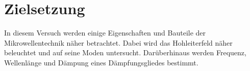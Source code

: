 \section{Zielsetzung}
\label{sec:Zielsetzung}

In diesem Versuch werden einige Eigenschaften und Bauteile der Mikrowellentechnik näher betrachtet. Dabei wird das Hohleiterfeld näher beleuchtet und auf seine Moden untersucht. Darüberhinaus werden Frequenz, Wellenlänge und Dämpung eines Dämpfungsgliedes bestimmt.
